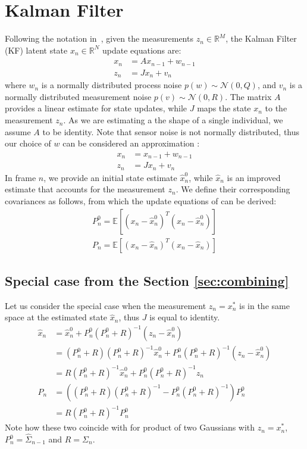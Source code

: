 \appendix
\section{Kalman Filter} 
\label{app:kalman}
Following the notation in~\cite{welch1995introduction}, given the measurements $z_n \in \mathbb{R}^M$, the Kalman Filter (KF) latent state $x_n \in \mathbb{R}^N$ update equations are:
% 
\begin{align}
x_n &= A x_{n - 1} +  w_{n - 1} \\
z_n &= J x_n + v_n
\end{align}
% 
where $w_n$ is a normally distributed process noise $p(w) \sim \mathcal{N}(0, Q)$, and $v_n$ is a normally distributed measurement noise $p(v) \sim \mathcal{N}(0, R)$. The matrix $A$ provides a linear estimate for state updates, while $J$ maps the state $x_n$ to the measurement $z_n$. As we are estimating a the shape of a single individual, we assume $A$ to be identity. Note that sensor noise is not normally distributed, thus our choice of $w$ can be considered an approximation :
% 
\begin{align}
x_n &= x_{n - 1} + w_{n - 1} \\
z_n &= J x_n + v_n
\end{align}
% 
In frame $n$, we provide an initial state estimate $\hat{x}_n^0$, while $\hat{x}_n$ is an improved estimate that accounts for the measurement $z_n$.
We define their corresponding covariances as follows, from which the update equations of  can be derived:
% 
\begin{align}
P_n^0=\mathbb{E}[(x_n - \hat{x}_n^0)^T(x_n - \hat{x}_n^0)]\\
P_n =\mathbb{E}[(x_n - \hat{x}_n)^T(x_n - \hat{x}_n)]
\end{align}
% 


\subsection{Special case from the Section  \ref{sec:combining}}
Let us consider the special case when the measurement $z_n = x_n^*$ is in the same space at the estimated state $\hat{x}_n$, thus $J$ is equal to identity.
% 
\begin{align*}
\hat{x}_n 
&= \hat{x}_n^0 + P_n^0  (P_n^0 + R)^{-1}(z_n - \hat{x}_n^0) \\
&= (P_n^0 + R)(P_n^0 + R)^{-1}\hat{x}_n^0 + P_n^0  (P_n^0 + R)^{-1}(z_n - \hat{x}_n^0) \\
&= R(P_n^0 + R)^{-1}\hat{x}_n^0 + P_n^0  (P_n^0 + R)^{-1}z_n \\
% 
% 
P_n &= ((P_n^0 + R) (P_n^0 + R)^{-1} - P_n^0  (P_n^0 + R)^{-1}) P_n^0\\
&= R (P_n^0 + R)^{-1} P_n^0
\end{align*}
% 
Note how these two coincide with  for product of two Gaussians  with $z_n = x_n^*$, $P_n^0 = \hat{\Sigma}_{n - 1}$ and $R = \Sigma_{n}$.

